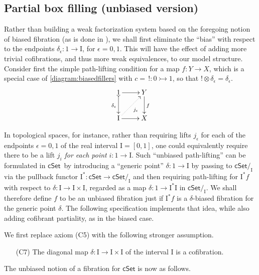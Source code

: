 \documentclass[11pt,reqno]{amsart}
\newcommand{\cSet}{\ensuremath{\mathsf{cSet}}}
\newcommand{\slice}[1]{\ensuremath{/_{\!{#1}}}}
\newcommand{\mono}{\ensuremath{\rightarrowtail}}
\newcommand{\ra}{\ensuremath{\rightarrow}}
\renewcommand{\to}{\ensuremath{\rightarrow}}
\newcommand{\I}{\ensuremath{\mathrm{I}}}
\theoremstyle{remark}
\theoremstyle{definition}
\begin{document}
\subsection*{Partial box filling (unbiased version)}\label{subsec:unbiasedfibration}

Rather than building a weak factorization system based on the foregoing notion of biased fibration (as is done in \cite{GS}), we shall first eliminate the ``bias'' with respect to the endpoints $\delta_\epsilon : 1 \ra \I$, for $\epsilon = 0,1$.  This will have the effect of adding more trivial cofibrations, and thus more weak equivalences, to our model structure. Consider first the simple path-lifting condition for a map $f : Y \to X$, which is a special case of \eqref{diagram:biasedfillers} with $c =\, ! : 0\mono 1$, so that $!\otimes\delta_\epsilon = \delta_\epsilon$.
\begin{equation*}
\xymatrix{
1 \ar@{>->}[d]_{\delta_\epsilon} \ar[r] & Y \ar[d]^f \\
\I \ar@{.>}[ru]_{j_\epsilon} \ar[r] & X
}
\end{equation*}

In topological spaces, for instance, rather than requiring lifts $j_\epsilon$ for each of the endpoints $\epsilon = 0,1$  of the real interval $\I = [0,1]$, one could equivalently require there to be a lift $j_i$ \emph{for each point} $i: 1\ra\I$. Such ``unbiased path-lifting'' can be formulated in \cSet\ by introducing a ``generic point'' $\delta : 1\ra \I$ by passing to $\cSet\slice{\I}$ via the pullback functor $\I^* : \cSet\to \cSet\slice{\I}$ and then requiring path-lifting for $\I^*f$ with respect to $\delta : \I \to \I\times \I$, regarded as a map $\delta : 1\to\I^*{\I}$ in $\cSet\slice{\I}$. We shall therefore define $f$ to be an unbiased fibration just if $\I^*f$ is a $\delta$-biased fibration for the generic point $\delta$.  The following specification implements that  idea, while also adding cofibrant partiality, as in the biased case.  

We first replace axiom (C5) with the following stronger assumption.
%
\begin{enumerate}
\item[(C7)] The diagonal map $\delta : \I\ra\I\times\I$ of the interval $\I$  is a cofibration.  
\end{enumerate}

The unbiased notion of a fibration for $\cSet$ is now as follows.
\end{document}
